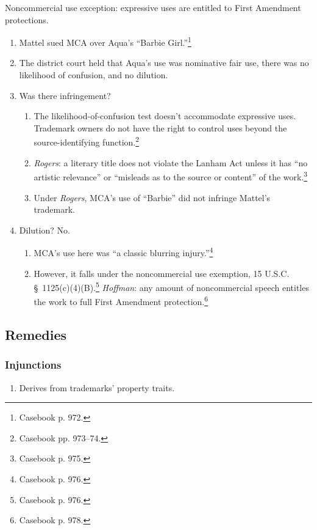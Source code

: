 Noncommercial use exception: expressive uses are entitled to First Amendment 
protections.

\begin{enumerate}
    \item Mattel sued MCA over Aqua's ``Barbie Girl.''\footnote{Casebook p. 
    972.}
    \item The district court held that Aqua's use was nominative fair use, 
    there was no likelihood of confusion, and no dilution.
    \item Was there infringement?
    \begin{enumerate}
        \item The likelihood-of-confusion test doesn't accommodate expressive 
        uses. Trademark owners do not have the right to control uses beyond 
        the source-identifying function.\footnote{Casebook pp. 973--74.}
        \item \emph{Rogers}: a literary title does not violate the Lanham Act 
        unless it has ``no artistic relevance'' or ``misleads as to the source 
        or content'' of the work.\footnote{Casebook p. 975.}
        \item Under \emph{Rogers}, MCA's use of ``Barbie'' did not infringe 
        Mattel's trademark.
    \end{enumerate}
    \item Dilution? No.
    \begin{enumerate}
        \item MCA's use here was ``a classic blurring 
        injury.''\footnote{Casebook p. 976.}
        \item However, it falls under the noncommercial use exemption, 15 
        U.S.C. \S\ 1125(c)(4)(B).\footnote{Casebook p. 976.} \emph{Hoffman}: 
        any amount of noncommercial speech entitles the work to full First 
        Amendment protection.\footnote{Casebook p. 978.}
    \end{enumerate}
\end{enumerate}

\subsection{Remedies}

\subsubsection{Injunctions}

\begin{enumerate}
    \item Derives from trademarks' property traits.
\end{enumerate}

